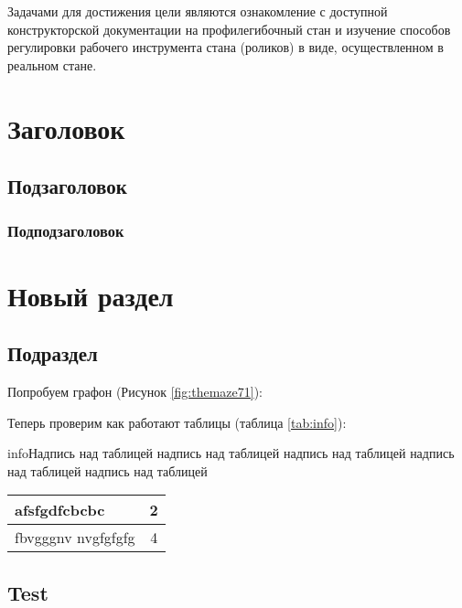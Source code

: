 \documentclass{gostdoc}
\begin{document}
Задачами для достижения цели являются ознакомление с доступной конструкторской документации на профилегибочный стан и изучение способов регулировки рабочего инструмента стана (роликов) в виде, осуществленном в реальном стане.

\section{Заголовок}
\lipsum[1-2]

\subsection{Подзаголовок}
\lipsum[5-6]

\subsubsection{Подподзаголовок}
\lipsum[10]

\section{Новый раздел}
\lipsum[4-5]

\subsection{Подраздел}
Попробуем графон (Рисунок \ref{fig:themaze71}):


\lipsum[2-4]

Теперь проверим как работают таблицы (таблица \ref{tab:info}):

\begin{inserttable}[1.15]{info}{Надпись над таблицей надпись над таблицей надпись над таблицей надпись над таблицей надпись над таблицей}
    \begin{tabular}{|l|c|}
        \hline
        afsfgdfcbcbc       & 2 \\
        \hline
        fbvgggnv nvgfgfgfg & 4 \\
        \hline
    \end{tabular}
\end{inserttable}

\lipsum[1]

\subsection{Test}
\lipsum[1]
\end{document}
